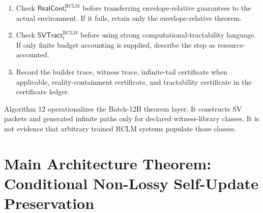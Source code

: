 \documentclass[11pt,a4paper]{article}
\newcommand{\Kcal}{\mathcal K}
\newcommand{\RCLM}{\mathrm{RCLM}}
\begin{document}
\begin{enumerate}[label=(\arabic*),leftmargin=1.5em]
    \[
    \Kcal_t^{\RCLM\text{-}\mathrm{SV\mbox{-}seedlib},\infty}
    \Rightarrow
    \Kcal_t^{\RCLM\text{-}\mathrm{SV},\infty,\mathrm{gen}}.
    \]
    \item Check \(\mathsf{RealCont}_t^{\RCLM}\) before transferring envelope-relative guarantees to the actual environment.  If it fails, retain only the envelope-relative theorem.
    \item Check \(\mathsf{SVTract}_t^{\RCLM}\) before using strong computational-tractability language.  If only finite budget accounting is supplied, describe the step as resource-accounted.
    \item Record the builder trace, witness trace, infinite-tail certificate when applicable, reality-containment certificate, and tractability certificate in the certificate ledger.
\end{enumerate}
Algorithm 12 operationalizes the Batch-12B theorem layer.  It constructs SV packets and generated infinite paths only for declared witness-library classes.  It is not evidence that arbitrary trained RCLM systems populate those classes.


\section{Main Architecture Theorem: Conditional Non-Lossy Self-Update Preservation}
\end{document}
